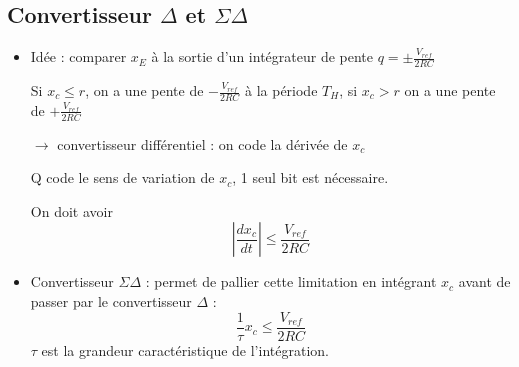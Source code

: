 \documentclass[main.tex]{subfiles}
\begin{document}
\subsection{Convertisseur $\Delta$ et $\Sigma\Delta$}

\begin{itemize}
\item Idée : comparer $x_E$ à la sortie d'un intégrateur de pente $q= \pm\frac{V_{ref}}{2RC}$


Si $x_c \leq r$, on a une pente de $-\frac{V_{ref}}{2RC}$ à la période $T_H$, si $x_c > r$ on a une pente de $+\frac{V_{ref}}{2RC}$

$\rightarrow$ convertisseur différentiel : on code la dérivée de $x_c$


Q code le sens de variation de $x_c$, 1 seul bit est nécessaire.

On doit avoir \[|\frac{dx_c}{dt}| \leq \frac{V_{ref}}{2RC}\]

\item Convertisseur $\Sigma\Delta$ :
permet de pallier cette limitation en intégrant $x_c$ avant de passer par le convertisseur $\Delta$ : \[\frac{1}{\tau}x_c \leq \frac{V_{ref}}{2RC}\] $\tau$ est la grandeur caractéristique de l'intégration.


\end{itemize}
\end{document}
